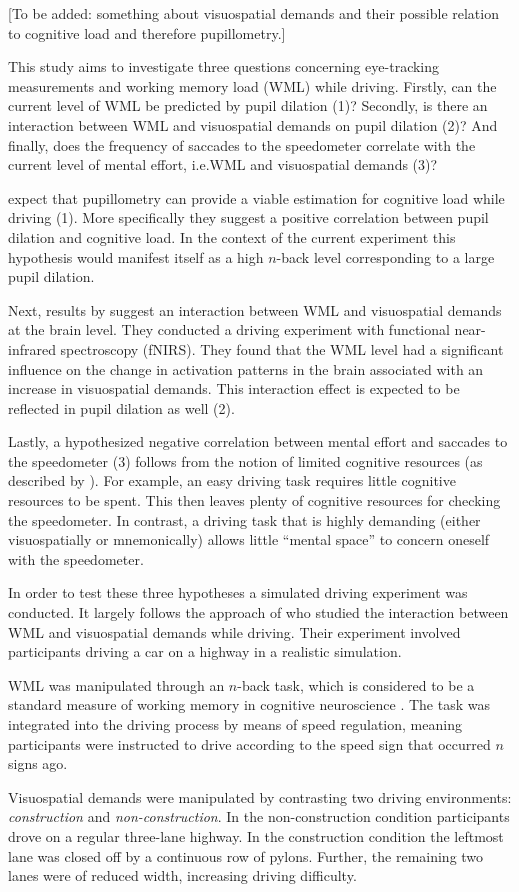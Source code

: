 [To be added: something about visuospatial demands and their possible relation to cognitive load and therefore pupillometry.]

This study aims to investigate three questions concerning eye-tracking measurements and working memory load (WML) while driving. 
Firstly, can the current level of WML be predicted by pupil dilation (1)? 
Secondly, is there an interaction between WML and visuospatial demands on pupil dilation (2)?
And finally, does the frequency of saccades to the speedometer correlate with the current level of mental effort, i.e.\@ WML and visuospatial demands (3)?

\citet{Palinko2010} expect that pupillometry can provide a viable estimation for cognitive load while driving (1). 
More specifically they suggest a positive correlation between pupil dilation and cognitive load.
In the context of the current experiment this hypothesis would manifest itself as a high \(n\)-back level corresponding to a large pupil dilation.

Next, results by \citet{Scheunemann2019} suggest an interaction between WML and visuospatial demands at the brain level. 
They conducted a driving experiment with functional near-infrared spectroscopy (fNIRS).
They found that the WML level had a significant influence on the change in activation patterns in the brain associated with an increase in visuospatial demands.
This interaction effect is expected to be reflected in pupil dilation as well (2).

Lastly, a hypothesized negative correlation between mental effort and saccades to the speedometer (3) follows from the notion of limited cognitive resources (as described by \citet{DeWaard1996}).
For example, an easy driving task requires little cognitive resources to be spent.
This then leaves plenty of cognitive resources for checking the speedometer.
In contrast, a driving task that is highly demanding (either visuospatially or mnemonically) allows little ``mental space'' to concern oneself with the speedometer.

In order to test these three hypotheses a simulated driving experiment was conducted.
It largely follows the approach of \citet{Scheunemann2019} who studied the interaction between WML and visuospatial demands while driving.
Their experiment involved participants driving a car on a highway in a realistic simulation. 

WML was manipulated through an \(n\)-back task, which is considered to be a standard measure of working memory in cognitive neuroscience \citep{Kane2007}.
The task was integrated into the driving process by means of speed regulation, meaning participants were instructed to drive according to the speed sign that occurred \(n\) signs ago.

Visuospatial demands were manipulated by contrasting two driving environments: \textit{construction} and \textit{non-construction}.
In the non-construction condition participants drove on a regular three-lane highway.
In the construction condition the leftmost lane was closed off by a continuous row of pylons.
Further, the remaining two lanes were of reduced width, increasing driving difficulty.